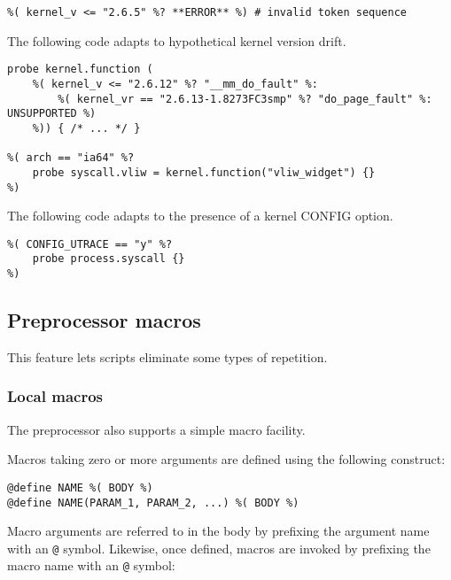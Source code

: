 \documentclass[twoside,english]{article}
\newenvironment{vindent}
{\begin{list}{}{\setlength{\listparindent}{6pt}}
\item[]}
{\end{list}}
\begin{document}
\begin{vindent}
\begin{verbatim}
%( kernel_v <= "2.6.5" %? **ERROR** %) # invalid token sequence
\end{verbatim}
\end{vindent}
The following code adapts to hypothetical kernel version drift.

\begin{vindent}
\begin{verbatim}
probe kernel.function (
    %( kernel_v <= "2.6.12" %? "__mm_do_fault" %:
        %( kernel_vr == "2.6.13-1.8273FC3smp" %? "do_page_fault" %: UNSUPPORTED %)
    %)) { /* ... */ }

%( arch == "ia64" %?
    probe syscall.vliw = kernel.function("vliw_widget") {}
%)

\end{verbatim}
\end{vindent}

The following code adapts to the presence of a kernel CONFIG option.

\begin{vindent}
\begin{verbatim}
%( CONFIG_UTRACE == "y" %?
    probe process.syscall {}
%)
\end{verbatim}
\end{vindent}


\subsection{Preprocessor macros}

This feature lets scripts eliminate some types of repetition.

\subsubsection{Local macros}

The preprocessor also supports a simple macro facility.

Macros taking zero or more arguments are defined using the following
construct:

\begin{vindent}
\begin{verbatim}
@define NAME %( BODY %)
@define NAME(PARAM_1, PARAM_2, ...) %( BODY %)
\end{verbatim}
\end{vindent}

Macro arguments are referred to in the body by prefixing the argument
name with an \texttt{@} symbol. Likewise, once defined, macros are
invoked by prefixing the macro name with an \texttt{@} symbol:
\end{document}
